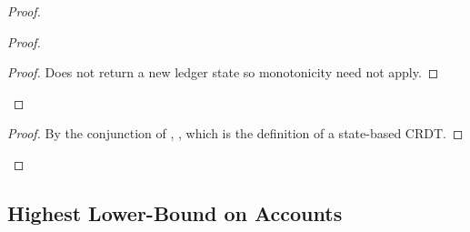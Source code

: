 \documentclass[9pt, oneside]{article}   	%
\begin{document}
\begin{proof}
\begin{proof}
		\begin{proof}
			Does not return a new ledger state so monotonicity need not apply.
		\end{proof}

	\end{proof}

	
	\qedstep
	\begin{proof}
		By the conjunction of , ,  which is the definition of a state-based CRDT.
	\end{proof}
\end{proof}

\subsection{Highest Lower-Bound on Accounts}
\label{sec:hlb}
\end{document}
